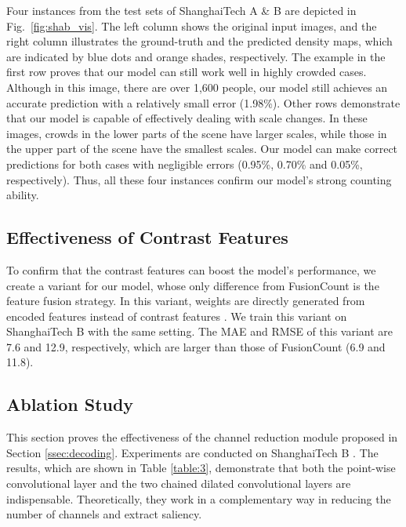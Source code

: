 \documentclass{article}
\begin{document}
Four instances from the test sets of ShanghaiTech A \& B are depicted in Fig.~\ref{fig:shab_vis}. The left column shows the original input images, and the right column illustrates the ground-truth and the predicted density maps, which are indicated by blue dots and orange shades, respectively. The example in the first row proves that our model can still work well in highly crowded cases. Although in this  image, there are over 1,600 people, our model still achieves an accurate prediction with a relatively small error (1.98\%). Other rows demonstrate that our model is capable of effectively dealing with scale changes. In these images, crowds in the lower parts of the scene have larger scales, while those in the upper part of the scene have the smallest scales. Our model can make correct predictions for both cases with negligible errors (0.95\%, 0.70\% and 0.05\%, respectively). Thus, all these four instances confirm our model's strong counting ability. 
 
\subsection{Effectiveness of Contrast Features}
\label{ssec:contrast_features}

To confirm that the contrast features can boost the model's performance, we create a variant for our model, whose only difference from FusionCount is the feature fusion strategy. In this variant, weights are directly generated from encoded features  instead of contrast features . We train this variant on ShanghaiTech B \cite{MCNN} with the same setting. The MAE and RMSE of this variant are 7.6 and 12.9, respectively, which are larger than those of FusionCount (6.9 and 11.8). 
 
\subsection{Ablation Study}
\label{ssec:ablation_study}

This section proves the effectiveness of the channel reduction module proposed in Section \ref{ssec:decoding}. Experiments are conducted on ShanghaiTech B \cite{MCNN}. The results, which are shown in Table \ref{table:3}, demonstrate that both the point-wise convolutional layer and the two chained dilated convolutional layers are indispensable. Theoretically, they work in a complementary way in reducing the number of channels and extract saliency.
\end{document}
